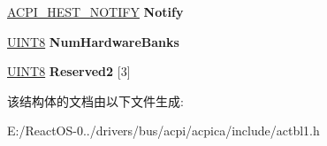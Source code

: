 \begin{DoxyCompactItemize}
\hyperlink{structacpi__hest__notify}{A\+C\+P\+I\+\_\+\+H\+E\+S\+T\+\_\+\+N\+O\+T\+I\+FY} {\bfseries Notify}
\item 
\mbox{\label{structacpi__hest__ia__corrected_a3bba0b71bb77d3329a718332e59cc63a}} 
\hyperlink{_processor_bind_8h_ab27e9918b538ce9d8ca692479b375b6a}{U\+I\+N\+T8} {\bfseries Num\+Hardware\+Banks}
\item 
\mbox{\label{structacpi__hest__ia__corrected_abf10ccb7b4c86cbba2c56b354fac23d7}} 
\hyperlink{_processor_bind_8h_ab27e9918b538ce9d8ca692479b375b6a}{U\+I\+N\+T8} {\bfseries Reserved2} \mbox{[}3\mbox{]}
\end{DoxyCompactItemize}


该结构体的文档由以下文件生成\+:\begin{DoxyCompactItemize}
\item 
E\+:/\+React\+O\+S-\/0../drivers/bus/acpi/acpica/include/actbl1.\+h\end{DoxyCompactItemize}
